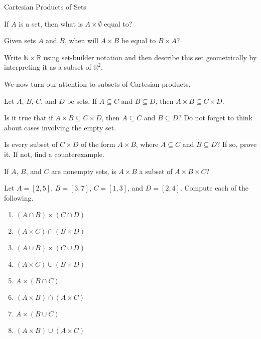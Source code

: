 \begin{section}{Cartesian Products of Sets}
\begin{problem}
If $A$ is a set, then what is $A\times \emptyset$ equal to?
\end{problem}

\begin{problem}
Given sets $A$ and $B$, when will $A\times B$ be equal to $B\times A$?
\end{problem}

\begin{problem}\label{prob:some lines}
Write $\mathbb{N}\times \mathbb{R}$ using set-builder notation and then describe this set geometrically by interpreting it as a subset of $\mathbb{R}^2$.
\end{problem}

We now turn our attention to subsets of Cartesian products.

\begin{theorem}
Let $A$, $B$, $C$, and $D$ be sets. If $A\subseteq C$ and $B\subseteq D$, then $A\times B\subseteq C\times D$.
\end{theorem}

\begin{problem}
Is it true that if $A\times B\subseteq C\times D$, then $A\subseteq C$ and $B\subseteq D$?  Do not forget to think about cases involving the empty set.
\end{problem}

\begin{problem}
Is every subset of $C\times D$ of the form $A\times B$, where $A\subseteq C$ and $B\subseteq D$?  If so, prove it.  If not, find a counterexample.
\end{problem}

\begin{problem}
If $A$, $B$, and $C$ are nonempty sets, is $A\times B$ a subset of $A\times B\times C$?
\end{problem}

\begin{problem}
Let $A=[2,5]$, $B=[3,7]$, $C=[1,3]$, and $D=[2,4]$.  Compute each of the following.
\begin{enumerate}[label=\textrm{(\alph*)}]
\item $(A\cap B)\times (C\cap D)$
\item $(A\times C)\cap (B\times D)$
\item $(A\cup B)\times (C\cup D)$
\item $(A\times C)\cup (B\times D)$
\item $A\times (B\cap C)$
\item $(A\times B)\cap (A\times C)$
\item $A\times (B\cup C)$
\item $(A\times B)\cup (A\times C)$
\end{enumerate}
\end{problem}


\end{section}
